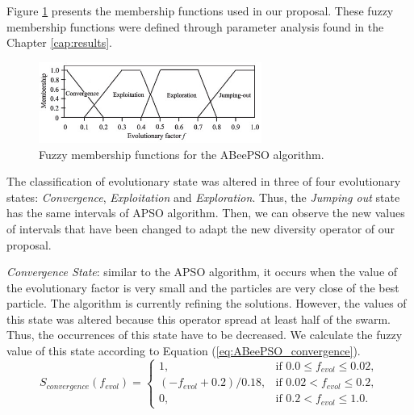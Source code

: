 Figure \ref{fig:factor_ABeePSO} presents the membership functions used in our proposal. These fuzzy membership functions were defined through parameter analysis found in the Chapter \ref{cap:results}.
\begin{figure}[!h]
\centering
 \includegraphics[width=0.65\textwidth]{image/factor_ABPSO}
 \caption{\small{Fuzzy membership functions for the ABeePSO algorithm.}}
 \label{fig:factor_ABeePSO}
\end{figure}

The classification of evolutionary state was altered in three of four evolutionary states: \emph{Convergence}, \emph{Exploitation} and \emph{Exploration}. Thus, the \emph{Jumping out} state has the same intervals of APSO algorithm. Then, we can observe the new values of intervals that have been changed to adapt the new diversity operator of our proposal.

\emph{Convergence State}: similar to the APSO algorithm, it occurs when the value of the evolutionary factor is very small and the particles are very close of the best particle. The algorithm is currently refining the solutions. However, the values of this state was altered because this operator spread at least half of the swarm. Thus, the occurrences of this state have to be decreased. We calculate the fuzzy value of this state according to Equation (\ref{eq:ABeePSO_convergence}).
\begin{equation}
S_{convergence}(f_{evol}) = \begin{cases}
1,                       & \mbox{if $0.0 \leq f_{evol} \leq 0.02$}, \\
(-f_{evol} + 0.2)/0.18,  & \mbox{if $0.02    < f_{evol} \leq 0.2$}, \\
0,                       & \mbox{if $0.2    < f_{evol} \leq 1.0$}.
\end{cases}
\label{eq:ABeePSO_convergence}
\end{equation}

